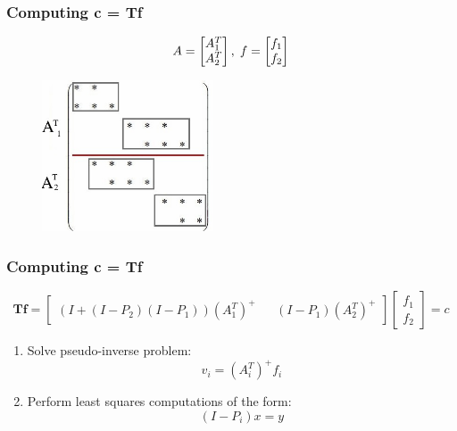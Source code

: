 \documentclass{beamer}
\begin{document}
\begin{frame}
\frametitle{Computing c = Tf}

%
$$A = \begin{bmatrix} A_1^T  \\ A_2^T \end{bmatrix}, \hspace{.1cm} f = \begin{bmatrix} f_1  \\ f_2 \end{bmatrix}$$
\begin{figure}[htbp] %
   \centering
   \includegraphics[width=2in]{Images/A1A2.jpg}
\end{figure}
\end{frame}

\begin{frame}
\frametitle{Computing c = Tf}

$$\textbf{Tf} = \begin{bmatrix} (I + (I-P_2)(I-P_1))(A_1^T)^+ && (I-P_1)(A_2^T)^+ \end{bmatrix} \begin{bmatrix} f_1  \\ f_2 \end{bmatrix}= c $$

\begin{enumerate}
\item Solve pseudo-inverse problem:
$$v_i = (A_i^T)^+f_i$$
\item Perform least squares computations of the form:
$$ (I-P_i) x =  y$$
\end{enumerate}
\end{frame}
\end{document}
